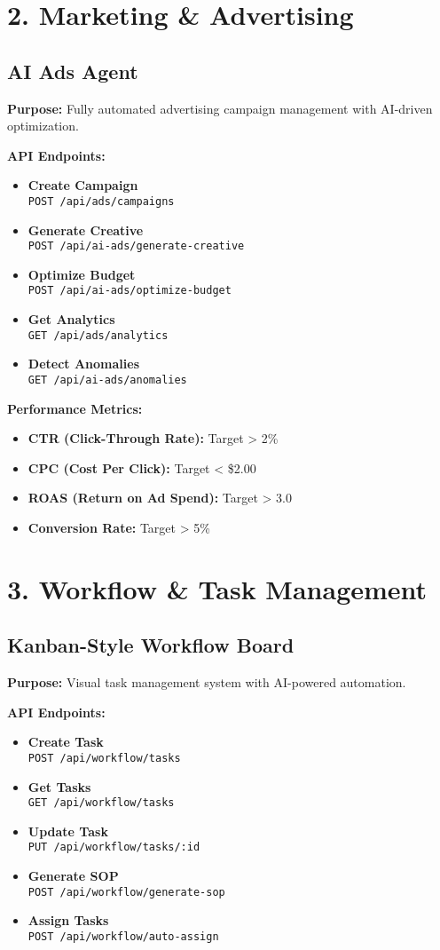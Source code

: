 \documentclass[12pt,a4paper]{article}
\newcommand{\apiendpoint}[2]{\textbf{#1} \\ \texttt{#2}}
\begin{document}
\section{2. Marketing \& Advertising}

\subsection{AI Ads Agent}
\textbf{Purpose:} Fully automated advertising campaign management with AI-driven optimization.

\textbf{API Endpoints:}
\begin{itemize}
    \item \apiendpoint{Create Campaign}{POST /api/ads/campaigns}
    \item \apiendpoint{Generate Creative}{POST /api/ai-ads/generate-creative}
    \item \apiendpoint{Optimize Budget}{POST /api/ai-ads/optimize-budget}
    \item \apiendpoint{Get Analytics}{GET /api/ads/analytics}
    \item \apiendpoint{Detect Anomalies}{GET /api/ai-ads/anomalies}
\end{itemize}

\textbf{Performance Metrics:}
\begin{itemize}
    \item \textbf{CTR (Click-Through Rate):} Target > 2\%
    \item \textbf{CPC (Cost Per Click):} Target < \$2.00
    \item \textbf{ROAS (Return on Ad Spend):} Target > 3.0
    \item \textbf{Conversion Rate:} Target > 5\%
\end{itemize}

\section{3. Workflow \& Task Management}

\subsection{Kanban-Style Workflow Board}
\textbf{Purpose:} Visual task management system with AI-powered automation.

\textbf{API Endpoints:}
\begin{itemize}
    \item \apiendpoint{Create Task}{POST /api/workflow/tasks}
    \item \apiendpoint{Get Tasks}{GET /api/workflow/tasks}
    \item \apiendpoint{Update Task}{PUT /api/workflow/tasks/:id}
    \item \apiendpoint{Generate SOP}{POST /api/workflow/generate-sop}
    \item \apiendpoint{Assign Tasks}{POST /api/workflow/auto-assign}
\end{itemize}
\end{document}
